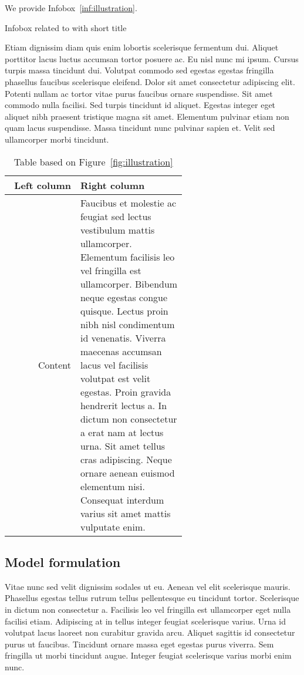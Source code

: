 \documentclass[paper = a4, fontsize = 12pt, numbers = noenddot, DIV = 15, twoside, 
paper = portrait,
listof = totoc,
listof = chapterentry,
egregdoesnotlikesansseriftitles, %
parskip = half %
]{scrbook}
\newcommand{\figref}[1]{Figure~\ref{#1}}
\newcommand{\infref}[1]{Infobox~\ref{#1}}
\newcommand{\drsh}{\hookrightarrow}
\begin{document}
We provide \infref{inf:illustration}.

\begin{infobox}[!htb]
	\caption{Infobox related to  with short title}
	\label{inf:illustration}
	Etiam dignissim diam quis enim lobortis scelerisque fermentum dui. Aliquet porttitor lacus luctus accumsan tortor posuere ac. Eu nisl nunc mi ipsum. Cursus turpis massa tincidunt dui. Volutpat commodo sed egestas egestas fringilla phasellus faucibus scelerisque eleifend. Dolor sit amet consectetur adipiscing elit. Potenti nullam ac tortor vitae purus faucibus ornare suspendisse. Sit amet commodo nulla facilisi. Sed turpis tincidunt id aliquet. Egestas integer eget aliquet nibh praesent tristique magna sit amet. Elementum pulvinar etiam non quam lacus suspendisse. Massa tincidunt nunc pulvinar sapien et. Velit sed ullamcorper morbi tincidunt.
\end{infobox}

\begin{table}
	\caption{Table based on \figref{fig:illustration}}
	\begin{center}
		\begin{tabular}{rp{0.6\linewidth}}
			\toprule
			Left column & Right column \\
			\midrule
			Content & 
			Faucibus et molestie ac feugiat sed lectus vestibulum mattis ullamcorper. Elementum facilisis leo vel fringilla est ullamcorper. Bibendum neque egestas congue quisque. Lectus proin nibh nisl condimentum id venenatis. Viverra maecenas accumsan lacus vel facilisis volutpat est velit egestas. Proin gravida hendrerit lectus a. In dictum non consectetur a erat nam at lectus urna. Sit amet tellus cras adipiscing. Neque ornare aenean euismod elementum nisi. Consequat interdum varius sit amet mattis vulputate enim. \\
			\bottomrule
		\end{tabular}
	\end{center}
\end{table}

\subsection{Model formulation}

\index{$\lambda$|see {lorem $\drsh$ ipsum}}

Vitae nunc sed velit dignissim sodales ut eu. Aenean vel elit scelerisque mauris. Phasellus egestas tellus rutrum tellus pellentesque eu tincidunt tortor. Scelerisque in dictum non consectetur a. Facilisis leo vel fringilla est ullamcorper eget nulla facilisi etiam. Adipiscing at in tellus integer feugiat scelerisque varius. Urna id volutpat lacus laoreet non curabitur gravida arcu. Aliquet sagittis id consectetur purus ut faucibus. Tincidunt ornare massa eget egestas purus viverra. Sem fringilla ut morbi tincidunt augue. Integer feugiat scelerisque varius morbi enim nunc.
\end{document}

